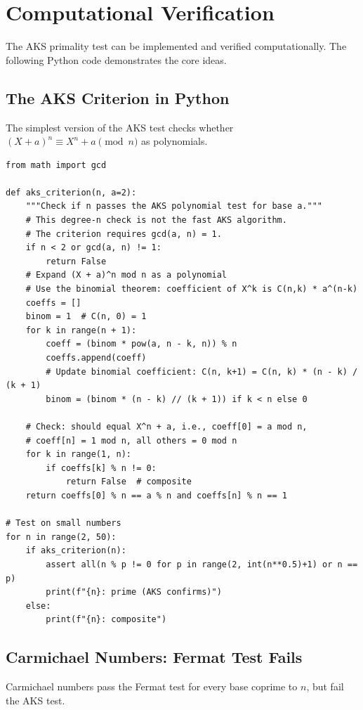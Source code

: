 \section{Computational Verification}

The AKS primality test can be implemented and verified computationally. The following Python code demonstrates the core ideas.

\subsection{The AKS Criterion in Python}

The simplest version of the AKS test checks whether $(X+a)^n \equiv X^n + a \pmod{n}$ as polynomials.

\begin{verbatim}
from math import gcd

def aks_criterion(n, a=2):
    """Check if n passes the AKS polynomial test for base a."""
    # This degree-n check is not the fast AKS algorithm.
    # The criterion requires gcd(a, n) = 1.
    if n < 2 or gcd(a, n) != 1:
        return False
    # Expand (X + a)^n mod n as a polynomial
    # Use the binomial theorem: coefficient of X^k is C(n,k) * a^(n-k)
    coeffs = []
    binom = 1  # C(n, 0) = 1
    for k in range(n + 1):
        coeff = (binom * pow(a, n - k, n)) % n
        coeffs.append(coeff)
        # Update binomial coefficient: C(n, k+1) = C(n, k) * (n - k) / (k + 1)
        binom = (binom * (n - k) // (k + 1)) if k < n else 0

    # Check: should equal X^n + a, i.e., coeff[0] = a mod n,
    # coeff[n] = 1 mod n, all others = 0 mod n
    for k in range(1, n):
        if coeffs[k] % n != 0:
            return False  # composite
    return coeffs[0] % n == a % n and coeffs[n] % n == 1

# Test on small numbers
for n in range(2, 50):
    if aks_criterion(n):
        assert all(n % p != 0 for p in range(2, int(n**0.5)+1) or n == p)
        print(f"{n}: prime (AKS confirms)")
    else:
        print(f"{n}: composite")
\end{verbatim}

\subsection{Carmichael Numbers: Fermat Test Fails}

Carmichael numbers pass the Fermat test for every base coprime to $n$, but fail the AKS test.

